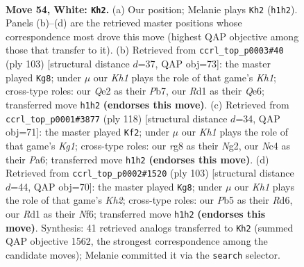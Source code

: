 \documentclass[11pt]{article}
\begin{document}
\clearpage

\begin{figure}[p]\centering
\begin{subfigure}{0.46\textwidth}\centering
\resizebox{\linewidth}{!}{%
\newchessgame
\chessboard[
  setfen={6r1/1q1n3k/8/1P5p/p1Np4/P7/4Q3/3R3K w - - 3 54},
  showmover=false,
  pgfstyle=straightmove, color=movearrow, markmove={h1-h2}
]}
\caption{}
\end{subfigure}\hfill
\begin{subfigure}{0.46\textwidth}\centering
\resizebox{\linewidth}{!}{%
\newchessgame
\chessboard[
  setfen={2r4k/1p6/4q3/P2Np1b1/6P1/7R/4Q3/7K b - - 0 52},
  showmover=false,
  pgfstyle=straightmove, color=movearrow, markmove={h8-g8}
]}
\caption{}
\end{subfigure}
\\[4pt]
\begin{subfigure}{0.46\textwidth}\centering
\resizebox{\linewidth}{!}{%
\newchessgame
\chessboard[
  setfen={6k1/6n1/PQ5p/3p3P/1p2p1P1/8/6N1/q5K1 w - - 3 60},
  showmover=false,
  pgfstyle=straightmove, color=movearrow, markmove={g1-f2}
]}
\caption{}
\end{subfigure}\hfill
\begin{subfigure}{0.46\textwidth}\centering
\resizebox{\linewidth}{!}{%
\newchessgame
\chessboard[
  setfen={8/1Q5k/3rqn1p/4Np2/8/6P1/5P1K/4R3 b - - 6 52},
  showmover=false,
  pgfstyle=straightmove, color=movearrow, markmove={h7-g8}
]}
\caption{}
\end{subfigure}
\caption{\textbf{Move 54, White: \texttt{Kh2}.} (a) Our position; Melanie plays \texttt{Kh2} (\texttt{h1h2}). Panels (b)--(d) are the retrieved master positions whose correspondence most drove this move (highest QAP objective among those that transfer to it). (b) Retrieved from \texttt{ccrl\_top\_p0003\#40} (ply 103) [structural distance $d$=37, QAP obj=73]: the master played \texttt{Kg8}; under $\mu$ our \emph{Kh1} plays the role of that game's \emph{Kh1}; cross-type roles: our \emph{Q}e2 as their \emph{P}b7, our \emph{R}d1 as their \emph{Q}e6; transferred move \texttt{h1h2} \textbf{(endorses this move)}. (c) Retrieved from \texttt{ccrl\_top\_p0001\#3877} (ply 118) [structural distance $d$=34, QAP obj=71]: the master played \texttt{Kf2}; under $\mu$ our \emph{Kh1} plays the role of that game's \emph{Kg1}; cross-type roles: our \emph{r}g8 as their \emph{N}g2, our \emph{N}c4 as their \emph{P}a6; transferred move \texttt{h1h2} \textbf{(endorses this move)}. (d) Retrieved from \texttt{ccrl\_top\_p0002\#1520} (ply 103) [structural distance $d$=44, QAP obj=70]: the master played \texttt{Kg8}; under $\mu$ our \emph{Kh1} plays the role of that game's \emph{Kh2}; cross-type roles: our \emph{P}b5 as their \emph{R}d6, our \emph{R}d1 as their \emph{N}f6; transferred move \texttt{h1h2} \textbf{(endorses this move)}. Synthesis: 41 retrieved analogs transferred to \texttt{Kh2} (summed QAP objective 1562, the strongest correspondence among the candidate moves); Melanie committed it via the \texttt{search} selector.}
\label{fig:thought-m106}
\end{figure}
\end{document}
